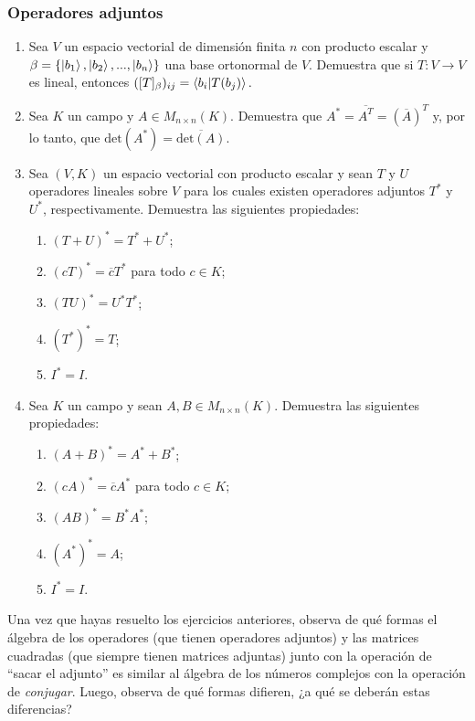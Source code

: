 \documentclass[12pt,libertine]{book}
\begin{document}
\subsubsection*{Operadores adjuntos} \label{Ejer:Operadores adjuntos}
\begin{enumerate}
    \item Sea $V$ un espacio vectorial de dimensión finita $n$ con producto escalar y $\beta=\{\ket{b_1},\ket{b_2},...,\ket{b_n}\}$ una base ortonormal de $V$. Demuestra que si $T:V\to V$ es lineal, entonces $([T]_\beta)_{ij}=\braket{b_i|T(b_j)}.$
    \item Sea $K$ un campo y $A\in M_{n\times n}(K)$. Demuestra que
    $A^*=\overline{A^T}=(\overline{A})^T$ y, por lo tanto, que $\text{det}(A^*)=\overline{\text{det}(A)}$.
    \item Sea $(V,K)$ un espacio vectorial con producto escalar y sean $T$ y $U$ operadores lineales sobre $V$ para los cuales existen operadores adjuntos $T^*$ y $U^*$, respectivamente. Demuestra las siguientes propiedades:
        \begin{enumerate}[label=\alph*)]
            \item $(T+U)^*=T^*+U^*$;
            \item $(cT)^*=\overline{c}T^*$ para todo $c\in K$;
            \item $(TU)^*=U^*T^*$;
            \item $(T^*)^*=T$;
            \item $I^*=I$.
        \end{enumerate}
    \item Sea $K$ un campo y sean $A,B\in M_{n\times n}(K)$. Demuestra las siguientes propiedades:
        \begin{enumerate}[label=\alph*)]
            \item $(A+B)^*=A^*+B^*$;
            \item $(cA)^*=\overline{c}A^*$ para todo $c\in K$;
            \item $(AB)^*=B^*A^*$;
            \item $(A^*)^*=A$;
            \item $I^*=I$.
        \end{enumerate}
\end{enumerate}

Una vez que hayas resuelto los ejercicios anteriores, observa de qué formas el álgebra de los operadores (que tienen operadores adjuntos) y las matrices cuadradas (que siempre tienen matrices adjuntas) junto con la operación de ``sacar el adjunto'' es similar al álgebra de los números complejos con la operación de \emph{conjugar}. Luego, observa de qué formas difieren, ¿a qué se deberán estas diferencias?
\end{document}
